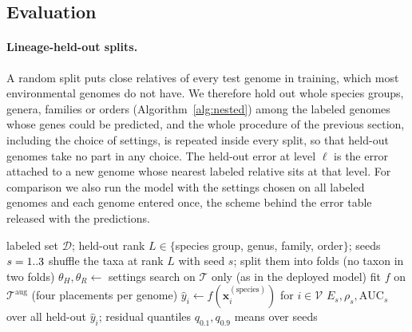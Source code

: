 \subsection{Evaluation}
\paragraph{Lineage-held-out splits.} A random split puts close relatives of every test genome in training, which most
environmental genomes do not have. We therefore hold out whole species groups, genera, families or orders
(Algorithm~\ref{alg:nested}) among the \NHeadlineRows labeled genomes whose genes could be predicted, and the whole
procedure of the previous section, including the choice of settings, is
repeated inside every split, so that held-out genomes take no part in any choice. The held-out error at level $\ell$ is the
error attached to a new genome whose nearest labeled relative sits at that level. For comparison we also run the model
with the settings chosen on all labeled genomes and each genome entered once, the scheme behind the error table released
with the predictions.

\begin{algorithm}[t]
\caption{Nested lineage-held-out evaluation}\label{alg:nested}
\footnotesize
\begin{algorithmic}[1]
\Require labeled set $\mathcal{D}$; held-out rank $L\in\{$species group, genus, family, order$\}$; seeds $s=1..3$
  \State shuffle the taxa at rank $L$ with seed $s$; split them into \NFolds folds (no taxon in two folds)
    \State $\theta_H,\theta_R\gets$ settings search on $\mathcal{T}$ only (as in the deployed model)
    \State fit $f$ on $\mathcal{T}^{\mathrm{aug}}$ (four placements per genome)
    \State $\hat y_i\gets f(\mathbf{x}^{(\text{species})}_i)$ for $i\in\mathcal{V}$
  \EndFor
  \State $E_s,\rho_s,\mathrm{AUC}_s$ over all held-out $\hat y_i$; residual quantiles $q_{0.1},q_{0.9}$
\EndFor
\State \Return means over seeds
\end{algorithmic}
\end{algorithm}

